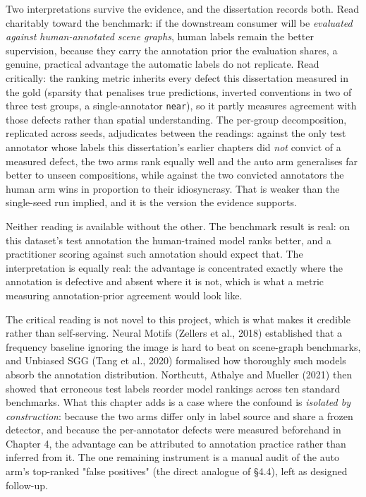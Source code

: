 Two interpretations survive the evidence, and the dissertation records both. Read charitably toward the benchmark: if the downstream consumer will be \textit{evaluated against human-annotated scene graphs}, human labels remain the better supervision, because they carry the annotation prior the evaluation shares, a genuine, practical advantage the automatic labels do not replicate. Read critically: the ranking metric inherits every defect this dissertation measured in the gold (sparsity that penalises true predictions, inverted conventions in two of three test groups, a single-annotator \texttt{near}), so it partly measures agreement with those defects rather than spatial understanding. The per-group decomposition, replicated across seeds, adjudicates between the readings: against the only test annotator whose labels this dissertation's earlier chapters did \textit{not} convict of a measured defect, the two arms rank equally well and the auto arm generalises far better to unseen compositions, while against the two convicted annotators the human arm wins in proportion to their idiosyncrasy. That is weaker than the single-seed run implied, and it is the version the evidence supports.

Neither reading is available without the other. The benchmark result is real: on this dataset's test annotation the human-trained model ranks better, and a practitioner scoring against such annotation should expect that. The interpretation is equally real: the advantage is concentrated exactly where the annotation is defective and absent where it is not, which is what a metric measuring annotation-prior agreement would look like.

The critical reading is not novel to this project, which is what makes it credible rather than self-serving. Neural Motifs (Zellers et al., 2018) established that a frequency baseline ignoring the image is hard to beat on scene-graph benchmarks, and Unbiased SGG (Tang et al., 2020) formalised how thoroughly such models absorb the annotation distribution. Northcutt, Athalye and Mueller (2021) then showed that erroneous test labels reorder model rankings across ten standard benchmarks. What this chapter adds is a case where the confound is \textit{isolated by construction}: because the two arms differ only in label source and share a frozen detector, and because the per-annotator defects were measured beforehand in Chapter 4, the advantage can be attributed to annotation practice rather than inferred from it. The one remaining instrument is a manual audit of the auto arm's top-ranked "false positives" (the direct analogue of \S4.4), left as designed follow-up.

